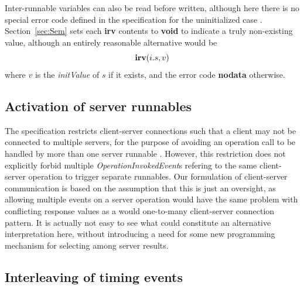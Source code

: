 \documentclass[10pt,conference]{IEEEtran}
\begin{document}
Inter-runnable variables can also be read before written, although here there is no special error code defined in the specification for the uninitialized case \cite[ch.~5.6.26]{AR:RTE}. Section~\ref{sec:Sem} sets each {\bf irv} contents to {\bf void} to indicate a truly non-existing value, although an entirely reasonable alternative would be
$$
  \textbf{irv}(i.s,v)
$$
where $v$ is the \emph{initValue} of $s$ if it exists, and the error code {\bf nodata} otherwise.


\subsection{Activation of server runnables}

The specification restricts client-server connections such that a client may not be connected to multiple servers, for the purpose of avoiding an operation call to be handled by more than one server runnable \cite[ch.~4.2.3]{AR:RTE}. However, this restriction does not explicitly forbid multiple \emph{Operation\-InvokedEvent}s refering to the same client-server operation to trigger separate runnables. Our formulation of client-server communication is based on the assumption that this is just an oversight, as allowing multiple events on a server operation would have the same problem with conflicting response values as a would one-to-many client-server connection pattern. It is actually not easy to see what could constitute an alternative interpretation here, without introducing a need for some new programming mechanism for selecting among server results.


\subsection{Interleaving of timing events}
\end{document}

